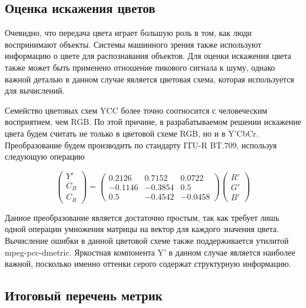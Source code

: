 \subsection{Оценка искажения цветов}


Очевидно, что передача цвета играет большую роль в том, как люди воспринимают
объекты. Системы машинного зрения также используют информацию о цвете для
распознавания объектов\cite{SelfDriving}. Для оценки искажения цвета также может
быть применено отношение пикового сигнала к шуму, однако важной деталью в данном
случае является цветовая схема, которая используется для вычислений.

Семейство цветовых схем YCC более точно соотносится с человеческим восприятием,
чем RGB\cite[291]{Poynton2001-sf}. По этой причине, в разрабатываемом решении
искажение цвета будем считать не только в цветовой схеме RGB, но и в Y'CbCr.
Преобразование будем производить по стандарту ITU-R BT.709\cite{bt709},
используя следующую операцию

\begin{equation} \label{eq:itu_ycc}
    \begin{pmatrix}
        Y' \\
        C_{B} \\
        C_{R}
    \end{pmatrix} = \begin{pmatrix}
        0.2126 & 0.7152 & 0.0722 \\
        -0.1146 & -0.3854 & 0.5 \\
        0.5 & -0.4542 & -0.0458
    \end{pmatrix} \begin{pmatrix}
        R' \\
        G' \\
        B'
    \end{pmatrix}
\end{equation}

Данное преобразование является достаточно простым, так как требует лишь одной
операции умножения матрицы на вектор для каждого значения цвета. Вычисление
ошибки в данной цветовой схеме также поддерживается утилитой mpeg-pcc-dmetric.
Яркостная компонента Y' в данном случае является наиболее важной, посколько
именно оттенки серого содержат структурную информацию.

\subsection{Итоговый перечень метрик}

